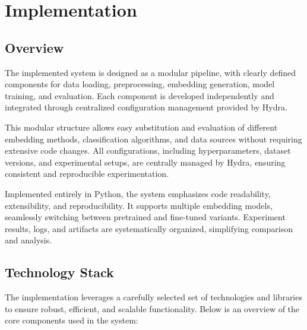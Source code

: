 \documentclass{SGGW-thesis-EN}
\begin{document}
\chapter{Implementation}

\section{Overview}

The implemented system is designed as a modular pipeline, with clearly defined components for data loading,
preprocessing, embedding generation, model training, and evaluation. Each component is developed independently
and integrated through centralized configuration management provided by Hydra.

This modular structure allows easy substitution and evaluation of different embedding methods, classification
algorithms, and data sources without requiring extensive code changes. All configurations, including
hyperparameters, dataset versions, and experimental setups, are centrally managed by Hydra, ensuring consistent
and reproducible experimentation.

Implemented entirely in Python, the system emphasizes code readability, extensibility, and reproducibility.
It supports multiple embedding models, seamlessly switching between pretrained and fine-tuned variants.
Experiment results, logs, and artifacts are systematically organized, simplifying comparison and analysis.

\section{Technology Stack}

The implementation leverages a carefully selected set of technologies and libraries to ensure robust, efficient, and scalable functionality.  
Below is an overview of the core components used in the system:
\end{document}
